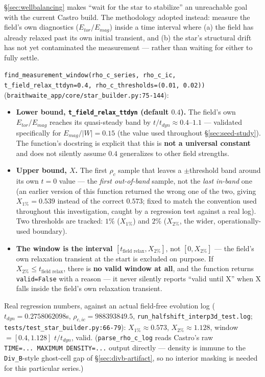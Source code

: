 \documentclass[11pt,a4paper]{scrartcl}
\newcommand{\code}[1]{\texttt{\small #1}}
\begin{document}
\S\ref{sec:wellbalancing} makes ``wait for the star to stabilize'' an
unreachable goal with the current Castro build. The methodology adopted
instead: measure the field's own diagnostics ($E_{tor}/E_{mag}$) inside
a time interval where (a) the field has already relaxed past its own
initial transient, and (b) the star's structural drift has not yet
contaminated the measurement --- rather than waiting for either to
fully settle.

\code{find\_measurement\_window(rho\_c\_series, rho\_c\_ic,
t\_field\_relax\_ttdyn=0.4, rho\_c\_thresholds=(0.01, 0.02))}
(\code{braithwaite\_app/core/star\_builder.py:75-144}):

\begin{itemize}[leftmargin=1.4em,itemsep=0.3em]
\item \textbf{Lower bound, \code{t\_field\_relax\_ttdyn} (default
  $0.4$).} The field's own $E_{tor}/E_{mag}$ reaches its quasi-steady
  band by $t/t_{dyn}\approx0.4$--$1.1$ --- validated specifically for
  $E_{mag}/|W|=0.15$ (the value used throughout \S\ref{sec:seed-study}).
  The function's docstring is explicit that this is \textbf{not a
  universal constant} and does not silently assume $0.4$ generalizes to
  other field strengths.
\item \textbf{Upper bound, $X$.} The first $\rho_c$ sample that leaves a
  $\pm$threshold band around its own $t=0$ value --- the \emph{first
  out-of-band} sample, not the \emph{last in-band} one (an earlier
  version of this function returned the wrong one of the two, giving
  $X_{1\%}=0.539$ instead of the correct $0.573$; fixed to match the
  convention used throughout this investigation, caught by a regression
  test against a real log). Two thresholds are tracked: $1\%$
  ($X_{1\%}$) and $2\%$ ($X_{2\%}$, the wider, operationally-used
  boundary).
\item \textbf{The window is the interval
  $[t_{\text{field relax}},X_{2\%}]$}, not $[0,X_{2\%}]$ --- the
  field's own relaxation transient at the start is excluded on purpose.
  If $X_{2\%}\le t_{\text{field relax}}$, there is \textbf{no valid
  window at all}, and the function returns \code{valid=False} with a
  reason --- it never silently reports ``valid until X'' when X falls
  inside the field's own relaxation transient.
\end{itemize}

Real regression numbers, against an actual field-free evolution log
($t_{dyn}=0.2758062098$s, $\rho_{c,ic}=988393849.5$,
\code{run\_halfshift\_interp3d\_test.log};
\code{tests/test\_star\_builder.py:66-79}): $X_{1\%}\approx0.573$,
$X_{2\%}\approx1.128$, window $=[0.4,1.128]$ $t/t_{dyn}$, valid.
(\code{parse\_rho\_c\_log} reads Castro's raw \code{TIME=...\ MAXIMUM
DENSITY=...} output directly --- density is immune to the
\code{Div\_B}-style ghost-cell gap of \S\ref{sec:divb-artifact}, so no
interior masking is needed for this particular series.)
\end{document}
